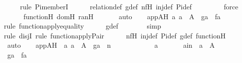 \begin{isabellebody}
\ \ \ \ \isamarkupfalse%
{\isacharparenleft}{\kern0pt}rule\ Pi{\isacharunderscore}{\kern0pt}memberI{\isacharparenright}{\kern0pt}\isanewline
\ \ \ \ \isamarkupfalse%
\ relation{\isacharunderscore}{\kern0pt}def\ g{\isacharunderscore}{\kern0pt}def\ nfH\ inj{\isacharunderscore}{\kern0pt}def\ Pi{\isacharunderscore}{\kern0pt}def\isanewline
\ \ \ \ \ \ \ \isamarkupfalse%
\ force\isanewline
\ \ \ \ \isamarkupfalse%
\ functionH\ domH\ ranH\ \isanewline
\ \ \ \ \isamarkupfalse%
\ auto\isanewline
\isanewline
\ \ \isamarkupfalse%
\ appAH{\isacharcolon}{\kern0pt}\ {\isachardoublequoteopen}{\isasymAnd}a{\isachardot}{\kern0pt}\ a\ {\isasymin}\ A\ {\isasymLongrightarrow}\ g{\isacharbackquote}{\kern0pt}a\ {\isacharequal}{\kern0pt}\ f{\isacharbackquote}{\kern0pt}a{\isachardoublequoteclose}\ \isanewline
\ \ \ \ \isamarkupfalse%
{\isacharparenleft}{\kern0pt}rule\ function{\isacharunderscore}{\kern0pt}apply{\isacharunderscore}{\kern0pt}equality{\isacharparenright}{\kern0pt}\isanewline
\ \ \ \ \isamarkupfalse%
\ g{\isacharunderscore}{\kern0pt}def\ \isanewline
\ \ \ \ \ \isamarkupfalse%
\ simp\isanewline
\ \ \ \ \ \isamarkupfalse%
{\isacharparenleft}{\kern0pt}rule\ disjI{}{\isacharcomma}{\kern0pt}\ rule\ function{\isacharunderscore}{\kern0pt}apply{\isacharunderscore}{\kern0pt}Pair{\isacharparenright}{\kern0pt}\isanewline
\ \ \ \ \isamarkupfalse%
\ nfH\ inj{\isacharunderscore}{\kern0pt}def\ Pi{\isacharunderscore}{\kern0pt}def\ g{\isacharunderscore}{\kern0pt}def\ functionH\isanewline
\ \ \ \ \isamarkupfalse%
\ auto\isanewline
\isanewline
\ \ \isamarkupfalse%
\ appAH{\isacharprime}{\kern0pt}\ {\isacharcolon}{\kern0pt}\ {\isachardoublequoteopen}{\isasymAnd}a{\isachardot}{\kern0pt}\ a\ {\isasymin}\ A\ {\isasymLongrightarrow}\ g{\isacharbackquote}{\kern0pt}a\ {\isasymin}\ n{\isachardoublequoteclose}\ \isanewline
\ \ \isamarkupfalse%
\ {\isacharminus}{\kern0pt}\ \isanewline
\ \ \ \ \isamarkupfalse%
\ a\ \isanewline
\ \ \ \ \isamarkupfalse%
\ ain\ {\isacharcolon}{\kern0pt}\ {\isachardoublequoteopen}a\ {\isasymin}\ A{\isachardoublequoteclose}\ \isanewline
\ \ \ \ \isamarkupfalse%
\ \isamarkupfalse%
\ {\isachardoublequoteopen}g{\isacharbackquote}{\kern0pt}a\ {\isacharequal}{\kern0pt}\ f{\isacharbackquote}{\kern0pt}a{\isachardoublequoteclose}\ \isamarkupfalse%

\end{isabellebody}
